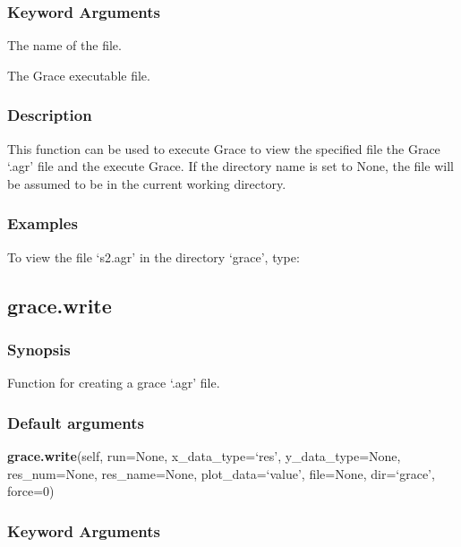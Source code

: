 \subsubsection{Keyword Arguments}

  The name of the file.

  The Grace executable file.

\subsubsection{Description}

This function can be used to execute Grace to view the specified file the Grace `.agr' file
and the execute Grace. If the directory name is set to None, the file will be assumed to be
in the current working directory.


\subsubsection{Examples}

To view the file `s2.agr' in the directory `grace', type:




\newpage

\subsection{grace.write}


\subsubsection{Synopsis}

Function for creating a grace `.agr' file.

\subsubsection{Default arguments}

\textsf{\textbf{grace.write}(self, run=None, x\_data\_type=`res', y\_data\_type=None, res\_num=None, res\_name=None, plot\_data=`value', file=None, dir=`grace', force=0)}


\subsubsection{Keyword Arguments}

